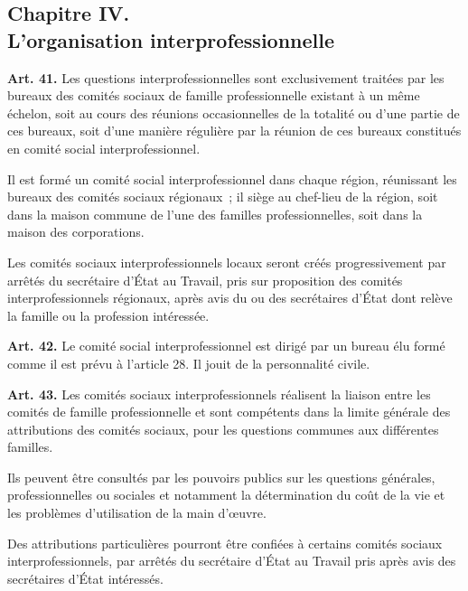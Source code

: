 \documentclass[french,twoside]{book} %
\newcommand{\labelchar}[1]{\textbf{\color{rubric} #1}}
\begin{document}
\subsection[{Chapitre IV. L’organisation interprofessionnelle}]{Chapitre IV. \\
L’organisation interprofessionnelle}
\noindent \labelchar{Art. 41.} Les questions interprofessionnelles sont exclusivement traitées par les bureaux des comités sociaux de famille professionnelle existant à un même échelon, soit au cours des réunions occasionnelles de la totalité ou d’une partie de ces bureaux, soit d’une manière régulière par la réunion de ces bureaux constitués en comité social interprofessionnel.\par
Il est formé un comité social interprofessionnel dans chaque région, réunissant les bureaux des comités sociaux régionaux ; il siège au chef-lieu de la région, soit dans la maison commune de l’une des familles professionnelles, soit dans la maison des corporations.\par
Les comités sociaux interprofessionnels locaux seront créés progressivement par arrêtés du secrétaire d’État au Travail, pris sur proposition des comités interprofessionnels régionaux, après avis du ou des secrétaires d’État dont relève la famille ou la profession intéressée.\par
\bigbreak
\noindent \labelchar{Art. 42.} Le comité social interprofessionnel est dirigé par un bureau élu formé comme il est prévu à l’article 28. Il jouit de la personnalité civile.\par
\bigbreak
\noindent \labelchar{Art. 43.} Les comités sociaux interprofessionnels réalisent la liaison entre les comités de famille professionnelle et sont compétents dans la limite générale des attributions des comités sociaux, pour les questions communes aux différentes familles.\par
Ils peuvent être consultés par les pouvoirs publics sur les questions générales, professionnelles ou sociales et notamment la détermination du coût de la vie et les problèmes d’utilisation de la main d’œuvre.\par
Des attributions particulières pourront être confiées à certains comités sociaux interprofessionnels, par arrêtés du secrétaire d’État au Travail pris après avis des secrétaires d’État intéressés.
\end{document}
